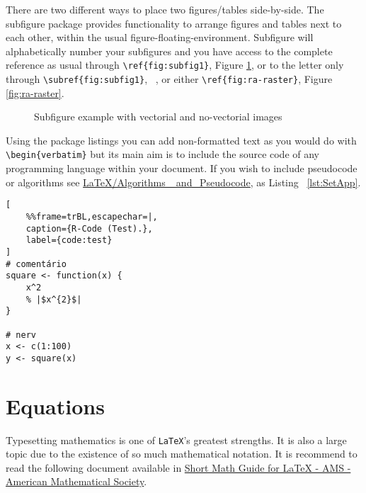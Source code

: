 There are two different ways to place two figures/tables side-by-side. The subfigure package provides functionality to arrange figures and tables next to each other, within the usual figure-floating-environment. Subfigure will alphabetically number your subfigures and you have access to the complete reference as usual through \verb!\ref{fig:subfig1}!, Figure \ref{fig:figura-completa}, or to the letter only through \verb!\subref{fig:subfig1}!, ~, or either \verb!\ref{fig:ra-raster}!, Figure \ref{fig:ra-raster}.

\begin{figure}[htbp]
	\centering
\qquad\qquad
  \caption{Subfigure example with vectorial and no-vectorial images}
  \label{fig:figura-completa}
\end{figure}


Using the package listings you can add non-formatted text as you would do with \verb!\begin{verbatim}! but its main aim is to include the source code of any programming language within your document. If you wish to include pseudocode or algorithms see \href{http://en.wikibooks.org/wiki/LaTeX/Algorithms_and_Pseudocode}{LaTeX/Algorithms\_ and\_Pseudocode}, as Listing ~\ref{lst:SetApp}.


\begin{minipage}{\textwidth}
\lstset{language=R,numbers=left}
\begin{lstlisting}[
    %%frame=trBL,escapechar=|,
    caption={R-Code (Test).},
    label={code:test}
]
# comentário
square <- function(x) {
    x^2
    % |$x^{2}$|
}

# nerv
x <- c(1:100)
y <- square(x)
\end{lstlisting}
\end{minipage}

\section{Equations}

Typesetting mathematics is one of \texttt{LaTeX}'s greatest strengths. It is also a large topic due to the existence of so much mathematical notation. It is recommend to read the following document available in \href{http://www.google.pt/url?sa=t&rct=j&q=&esrc=s&source=web&cd=1&cad=rja&ved=0CB4QFjAA&url=ftp%3A%2F%2Fftp.ams.org%2Fpub%2Ftex%2Fdoc%2Famsmath%2Fshort-math-guide.pdf&ei=DkScUOm8IJC5hAei7oGQDg&usg=AFQjCNEHl1pXuurNmXAdqfC0z-pPAbDyUw}{Short Math Guide for LaTeX - AMS - American Mathematical Society}.

